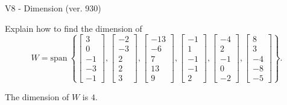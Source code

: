 \begin{exercise}
  \begin{exerciseTitle}V8 - Dimension (ver. 930)\end{exerciseTitle}
  \begin{exerciseStatement}
    Explain how to find the dimension of 
\[W=\mathrm{span}\ \left\{\left[\begin{array}{r}
3 \\
0 \\
-1 \\
-3 \\
-1
\end{array}\right] , \left[\begin{array}{r}
-2 \\
-3 \\
2 \\
2 \\
3
\end{array}\right] , \left[\begin{array}{r}
-13 \\
-6 \\
7 \\
13 \\
9
\end{array}\right] , \left[\begin{array}{r}
-1 \\
1 \\
-1 \\
-1 \\
2
\end{array}\right] , \left[\begin{array}{r}
-4 \\
2 \\
-1 \\
0 \\
-2
\end{array}\right] , \left[\begin{array}{r}
8 \\
3 \\
-4 \\
-8 \\
-5
\end{array}\right]\right\}.\]



  \end{exerciseStatement}
  \begin{exerciseAnswer}
   The dimension of \(W\) is  \(4\).
  


  \end{exerciseAnswer}
\end{exercise}